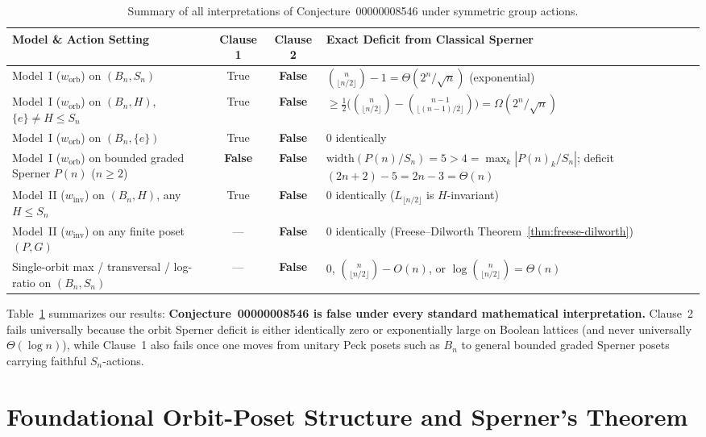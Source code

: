 \documentclass[11pt,a4paper]{article}
\theoremstyle{definition}
\newcommand{\Bn}{B_n}
\newcommand{\Sn}{S_n}
\newcommand{\width}{\mathrm{width}}
\newcommand{\worb}{w_{\mathrm{orb}}}
\newcommand{\winv}{w_{\mathrm{inv}}}
\begin{document}
\begin{table}[ht]
\centering
\small
\caption{Summary of all interpretations of Conjecture~00000008546 under symmetric group actions.}
\label{tab:summary}
\begin{tabular}{@{}p{4.6cm}ccp{5.3cm}@{}}
\toprule
\textbf{Model \& Action Setting} & \textbf{Clause 1} & \textbf{Clause 2} & \textbf{Exact Deficit from Classical Sperner} \\
\midrule
Model~I ($\worb$) on $(\Bn, \Sn)$ & True & \textbf{False} & $\binom{n}{\lfloor n/2 \rfloor} - 1 = \Theta(2^n/\sqrt{n})$ (exponential) \\
Model~I ($\worb$) on $(\Bn, H)$, $\{e\} \neq H \le \Sn$ & True & \textbf{False} & $\ge \frac{1}{2}\bigl(\binom{n}{\lfloor n/2 \rfloor} - \binom{n-1}{\lfloor (n-1)/2 \rfloor}\bigr) = \Omega(2^n/\sqrt{n})$ \\
Model~I ($\worb$) on $(\Bn, \{e\})$ & True & \textbf{False} & $0$ identically \\
Model~I ($\worb$) on bounded graded Sperner $P(n)$ ($n \ge 2$) & \textbf{False} & \textbf{False} & $\width(P(n)/\Sn) = 5 > 4 = \max_k |P(n)_k/\Sn|$; deficit $(2n+2)-5 = 2n-3 = \Theta(n)$ \\
Model~II ($\winv$) on $(\Bn, H)$, any $H \le \Sn$ & True & \textbf{False} & $0$ identically ($L_{\lfloor n/2 \rfloor}$ is $H$-invariant) \\
Model~II ($\winv$) on any finite poset $(P, G)$ & --- & \textbf{False} & $0$ identically (Freese--Dilworth Theorem~\ref{thm:freese-dilworth}) \\
Single-orbit max / transversal / log-ratio on $(\Bn, \Sn)$ & --- & \textbf{False} & $0$, $\binom{n}{\lfloor n/2 \rfloor} - O(n)$, or $\log\binom{n}{\lfloor n/2 \rfloor} = \Theta(n)$ \\
\bottomrule
\end{tabular}
\end{table}

Table~\ref{tab:summary} summarizes our results: \textbf{Conjecture~00000008546 is false under every standard mathematical interpretation.} Clause~2 fails universally because the orbit Sperner deficit is either identically zero or exponentially large on Boolean lattices (and never universally $\Theta(\log n)$), while Clause~1 also fails once one moves from unitary Peck posets such as $\Bn$ to general bounded graded Sperner posets carrying faithful $\Sn$-actions.

\section{Foundational Orbit-Poset Structure and Sperner's Theorem}
\end{document}
